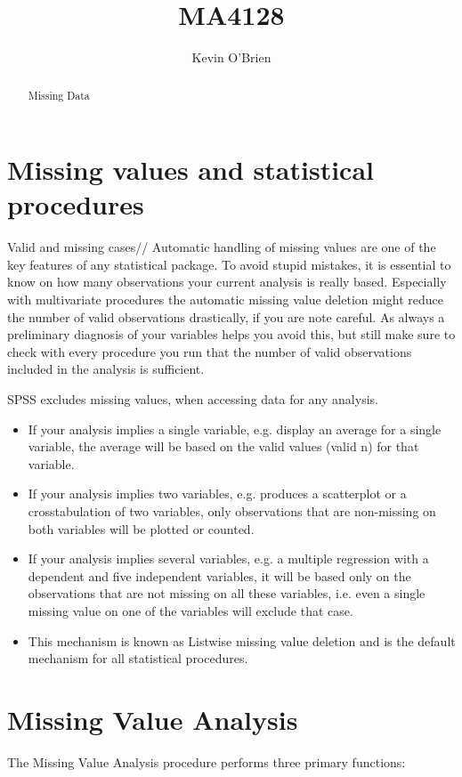 \documentclass[12pt]{article}
\title{MA4128}
\author{Kevin O'Brien}
\begin{document}
\maketitle

\begin{abstract}
Missing Data
\end{abstract}

\section{Missing values and statistical procedures}
Valid and missing cases//
Automatic handling of missing values are one of the key features of any statistical package. To avoid stupid mistakes, it is essential to know on how many observations your current analysis is really based. Especially with multivariate procedures the automatic missing value deletion might reduce the number of valid observations drastically, if you are note careful. As always a preliminary diagnosis of your variables helps you avoid this, but still make sure to check with every procedure you run that the number of valid observations included in the analysis is sufficient.

SPSS excludes missing values, when accessing data for any analysis.

\begin{itemize}
\item If your analysis implies a single variable, e.g. display an average for a single variable, the average will be based on the valid values (valid n) for that variable.
\item If your analysis implies two variables, e.g. produces a scatterplot or a crosstabulation of two variables, only observations that are non-missing on both variables will be plotted or counted.
\item If your analysis implies several variables, e.g. a multiple regression with a dependent and five independent variables, it will be based only on the observations that are not missing on all these variables, i.e. even a single missing value on one of the variables will exclude that case.
\item This mechanism is known as Listwise missing value deletion and is the default mechanism for all statistical procedures. 
\end{itemize}
\section{Missing Value Analysis}
%
The Missing Value Analysis procedure performs three primary functions:
\end{document}
